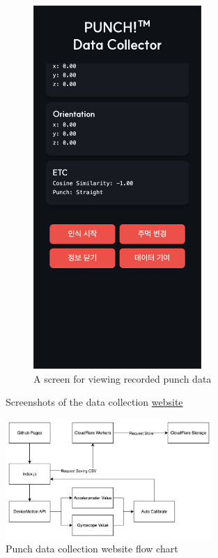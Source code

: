 \documentclass{article}
\begin{document}
\begin{figure}[h]
\begin{subfigure}{0.5\textwidth}
        \includegraphics[width=0.7\textwidth]{data_collection_web_info.png}
        \caption{A screen for viewing recorded punch data}
        \label{fig:data_collection_web_info}

    \end{subfigure}
    \caption{Screenshots of the data collection \href{https://punch-boxing.github.io/punch-data-collection-web/}{website}}
    \label{fig:data_collection_web_screenshots}
\end{figure}

\FloatBarrier
\begin{figure}[h]
    \centering
    \includegraphics[width=0.7\textwidth]{data_collection_flow_chart.png}
    \caption{Punch data collection website flow chart}
    \label{fig:data_collection_flow_chart}
\end{figure}
\end{document}
